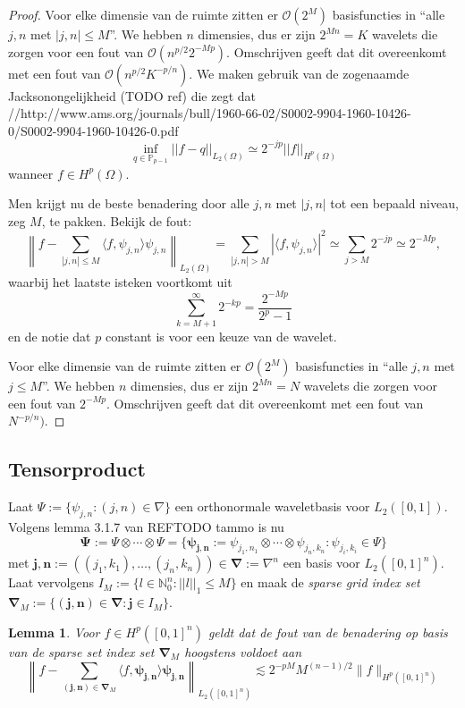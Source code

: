 \documentclass[11pt]{amsart}
\newtheorem*{lemma}{Lemma}
\newcommand{\N}{\mathbb{N}}
\begin{document}
\begin{proof}
Voor elke dimensie van de ruimte zitten er $\mathcal{O}(2^M)$ basisfuncties in ``alle ${j,n}$ met $|{j,n}| \leq M$''. We hebben $n$ dimensies, dus er zijn $2^{Mn} = K $ wavelets die zorgen voor een fout van $\mathcal{O}(n^{p/2} 2^{-Mp})$. Omschrijven geeft dat dit overeenkomt met een fout van $\mathcal{O}(n^{p/2} K^{-p/n})$.
\fi
We maken gebruik van de zogenaamde Jacksonongelijkheid (TODO ref) die zegt dat //http://www.ams.org/journals/bull/1960-66-02/S0002-9904-1960-10426-0/S0002-9904-1960-10426-0.pdf
\[
  \inf_{q \in \mathbb{P}_{p-1}} ||f - q||_{L_2(\Omega)} \simeq 2^{-jp} ||f||_{H^p(\Omega)}
\]
wanneer $f \in H^p(\Omega)$.

Men krijgt nu de beste benadering door alle ${j,n}$ met $|{j,n}|$ tot een bepaald niveau, zeg $M$, te pakken. Bekijk de fout:
\[
	\left\| f - \sum_{|{j,n}| \leq M} \langle f, \psi_{j,n} \rangle \psi_{j,n} \right\|_{L_2(\Omega)} = \sum_{|{j,n}| > M} | \langle f, \psi_{j,n} \rangle |^2 \simeq \sum_{j > M} 2^{-jp} \simeq 2^{-Mp},
\]
waarbij het laatste isteken voortkomt uit
\[
	\sum_{k=M+1}^\infty 2^{- kp} = \frac{2^{-Mp}}{2^p-1}
\]
en de notie dat $p$ constant is voor een keuze van de wavelet.

Voor elke dimensie van de ruimte zitten er $\mathcal{O}(2^M)$ basisfuncties in ``alle ${j,n}$ met $j \leq M$''. We hebben $n$ dimensies, dus er zijn $2^{Mn} = N $ wavelets die zorgen voor een fout van $2^{-Mp}$. Omschrijven geeft dat dit overeenkomt met een fout van $N^{-p/n})$.
\end{proof}

\subsection{Tensorproduct}
Laat $\Psi := \{ \psi_{j,n}: (j,n) \in \nabla \}$ een orthonormale waveletbasis voor $L_2([0,1])$. Volgens lemma 3.1.7 van REFTODO tammo is nu
\[
  \boldsymbol{\Psi} := \Psi \otimes \cdots \otimes \Psi = \{ \boldsymbol{\psi_{j,n}} := \psi_{j_1,n_1} \otimes \cdots \otimes \psi_{j_n,k_n}: \psi_{j_i,k_i} \in \Psi \}
\]
met $\boldsymbol{j,n} := ((j_1,k_1),\ldots,(j_n,k_n)) \in \boldsymbol{\nabla} := \nabla^n$ een basis voor $L_2([0,1]^n)$. Laat vervolgens $I_M := \{ l \in \N^n_0: ||l||_1 \leq M \}$ en maak de \emph{sparse grid index set} $\boldsymbol{\nabla}_M := \{ \boldsymbol{(j,n)} \in \boldsymbol{\nabla}: \boldsymbol{j} \in I_M \}$.

\begin{lemma}{\cite[P3.2.3]{tammo}}
  Voor $f \in H^p([0,1]^n)$ geldt dat de fout van de benadering op basis van de sparse set index set $\boldsymbol{\nabla}_M$ hoogstens voldoet aan
\[
  \left\| f - \sum_{\boldsymbol{(j,n)} \in \boldsymbol{\nabla}_M} \langle f, \boldsymbol{\psi_{j,n}} \rangle \boldsymbol{\psi_{j,n}} \right\|_{L_2([0,1]^n)} \lesssim 2^{-pM} M^{(n-1)/2} \| f \|_{H^p([0,1]^n)}
\]
\end{lemma}
\end{document}
